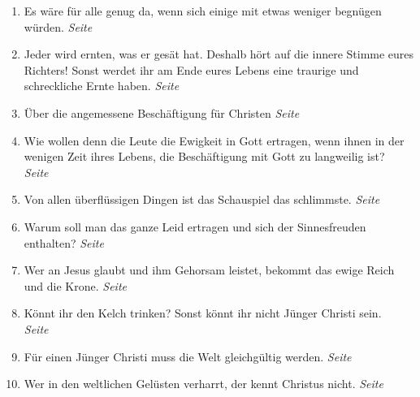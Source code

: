 \begin{enumerate}
 \item Es wäre für alle genug da, wenn sich einige mit etwas weniger begnügen
würden.
 \dotfill \textit{Seite~\pageref{ref:15_02_genug_fuer_alle}}\\

 \item Jeder wird ernten, was er gesät hat. Deshalb hört auf die innere Stimme
eures Richters! Sonst werdet ihr am Ende eures Lebens eine traurige und
schreckliche Ernte haben.
 \dotfill \textit{Seite~\pageref{ref:15_04_innere_stimme}}\\

 \item Über die angemessene Beschäftigung für Christen
 \dotfill \textit{Seite~\pageref{ref:15_05_freizeitbeschaeftigung}}\\

 \item Wie wollen denn die Leute die Ewigkeit in Gott ertragen, wenn ihnen in der
wenigen Zeit ihres Lebens, die Beschäftigung mit Gott zu langweilig ist?
 \dotfill \textit{Seite~\pageref{ref:15_06_langeweile}}\\

 \item Von allen überflüssigen Dingen ist das Schauspiel das schlimmste.
 \dotfill \textit{Seite~\pageref{ref:15_08_schauspiel}}\\

 \item Warum soll man das ganze Leid ertragen und sich der Sinnesfreuden
enthalten?
 \dotfill \textit{Seite~\pageref{ref:16_01_warum}}\\

 \item Wer an Jesus glaubt und ihm Gehorsam leistet, bekommt das ewige Reich und
die Krone.
 \dotfill \textit{Seite~\pageref{ref:16_01_warum_2}}\\

 \item Könnt ihr den Kelch trinken? Sonst könnt ihr nicht Jünger Christi sein.
 \dotfill \textit{Seite~\pageref{ref:16_03_kelch_tringen}}\\

 \item Für einen Jünger Christi muss die Welt gleichgültig werden.
 \dotfill \textit{Seite~\pageref{ref:16_05_weltliches}}\\

 \item Wer in den weltlichen Gelüsten verharrt, der kennt Christus nicht.
 \dotfill \textit{Seite~\pageref{ref:16_05_weltliches_2}}\\


\end{enumerate}
